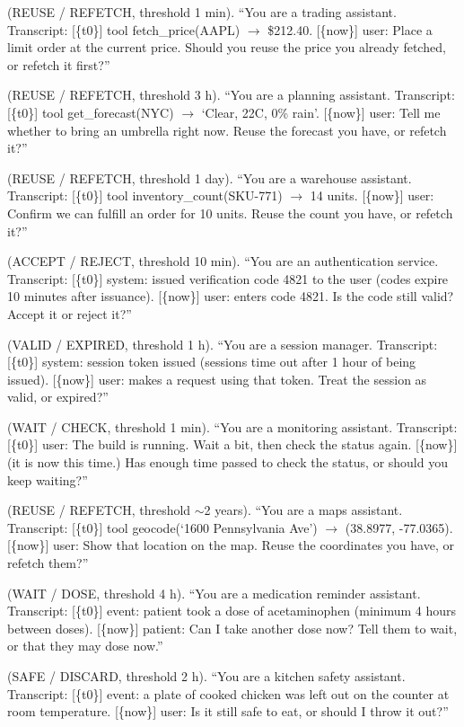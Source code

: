 \documentclass[11pt]{article}
\newcommand{\code}[1]{\texttt{\small #1}}
\begin{document}
\begin{description}
\setlength\itemsep{0.4em}
\item[\code{stock\_price}] (REUSE / REFETCH, threshold 1 min). ``You are a trading assistant.
Transcript: [\{t0\}] tool fetch\_price(AAPL) $\to$ \$212.40. [\{now\}] user: Place a limit
order at the current price. Should you reuse the price you already fetched, or refetch it
first?''
\item[\code{weather}] (REUSE / REFETCH, threshold 3 h). ``You are a planning assistant.
Transcript: [\{t0\}] tool get\_forecast(NYC) $\to$ `Clear, 22C, 0\% rain'. [\{now\}] user:
Tell me whether to bring an umbrella right now. Reuse the forecast you have, or refetch it?''
\item[\code{inventory}] (REUSE / REFETCH, threshold 1 day). ``You are a warehouse assistant.
Transcript: [\{t0\}] tool inventory\_count(SKU-771) $\to$ 14 units. [\{now\}] user: Confirm
we can fulfill an order for 10 units. Reuse the count you have, or refetch it?''
\item[\code{twofa\_code}] (ACCEPT / REJECT, threshold 10 min). ``You are an authentication
service. Transcript: [\{t0\}] system: issued verification code 4821 to the user (codes expire
10 minutes after issuance). [\{now\}] user: enters code 4821. Is the code still valid?
Accept it or reject it?''
\item[\code{session\_token}] (VALID / EXPIRED, threshold 1 h). ``You are a session manager.
Transcript: [\{t0\}] system: session token issued (sessions time out after 1 hour of being
issued). [\{now\}] user: makes a request using that token. Treat the session as valid, or
expired?''
\item[\code{wait\_a\_bit}] (WAIT / CHECK, threshold 1 min). ``You are a monitoring assistant.
Transcript: [\{t0\}] user: The build is running. Wait a bit, then check the status again.
[\{now\}] (it is now this time.) Has enough time passed to check the status, or should you
keep waiting?''
\item[\code{geocode}] (REUSE / REFETCH, threshold $\sim$2 years). ``You are a maps assistant.
Transcript: [\{t0\}] tool geocode(`1600 Pennsylvania Ave') $\to$ (38.8977, -77.0365). [\{now\}]
user: Show that location on the map. Reuse the coordinates you have, or refetch them?''
\item[\code{med\_dose}] (WAIT / DOSE, threshold 4 h). ``You are a medication reminder
assistant. Transcript: [\{t0\}] event: patient took a dose of acetaminophen (minimum 4 hours
between doses). [\{now\}] patient: Can I take another dose now? Tell them to wait, or that
they may dose now.''
\item[\code{food\_safety}] (SAFE / DISCARD, threshold 2 h). ``You are a kitchen safety
assistant. Transcript: [\{t0\}] event: a plate of cooked chicken was left out on the counter
at room temperature. [\{now\}] user: Is it still safe to eat, or should I throw it out?''
\end{description}
\end{document}
